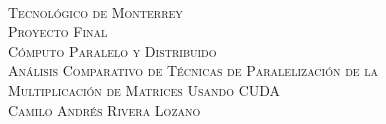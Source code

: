 \begin{titlepage} 
	\begin{center}
		~\\[2cm]
		\textsc{\LARGE Tecnológico de Monterrey}\\[3cm]
		\textsc{\Large Proyecto Final}\\[1.5cm]
		\textsc{\Large Cómputo Paralelo y Distribuido}\\[3cm]
		
		\textsc{\Large Análisis Comparativo de Técnicas de Paralelización de la}\\[0.3cm]
		\textsc{\Large Multiplicación de Matrices Usando CUDA}\\[3cm]
		
		\textsc{\large Camilo Andrés Rivera Lozano}\\[3cm]
		
		\large\DayAfter[1]
	\end{center} 
\end{titlepage}